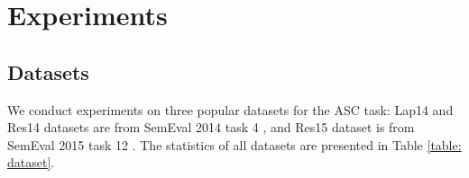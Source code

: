 \section{Experiments}
\subsection{Datasets}
We conduct experiments on three popular datasets for the ASC task:
Lap14 and Res14 datasets are from SemEval 2014 task 4 \cite{semeval2014}, and Res15 dataset is from SemEval 2015 task 12 \cite{semeval2015}.
The statistics of all datasets are presented in Table \ref{table: dataset}.
\begin{table}[ht]
\centering
\caption{Dataset statistics of the three datasets.}
\fontsize{8}{10}\selectfont
{}
\label{table: dataset}
\end{table}


